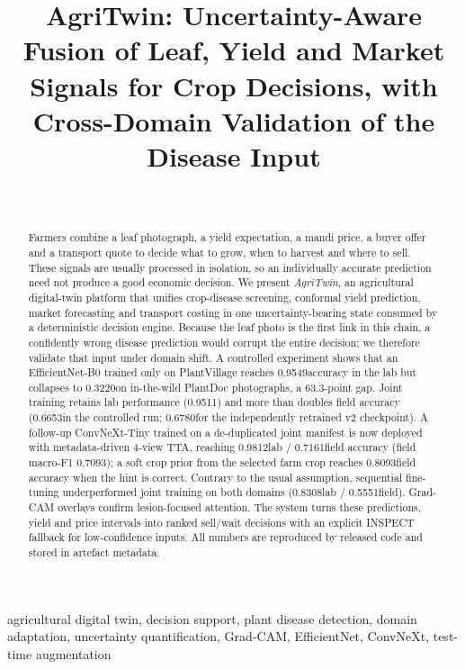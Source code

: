 \documentclass[journal,twocolumn,10pt]{IEEEtran}
\author{
  \IEEEauthorblockN{Jashwanth Aravapalli}\\
  \IEEEauthorblockA{Department of CSE (AI \& ML), Keshav Memorial Engineering College\\
  [CITY], [COUNTRY]\\
  [EMAIL]}
}
\newcommand{\PVvtwo}{0.9511}
\newcommand{\PDvtwo}{0.6780}
\newcommand{\EonePV}{0.9549}
\newcommand{\EonePD}{0.3220}
\newcommand{\EthreePDcontrolled}{0.6653}
\newcommand{\EfourPV}{0.8308}
\newcommand{\EfourPD}{0.5551}
\newcommand{\PVvthree}{0.9812}
\newcommand{\PDvthree}{0.7161}
\newcommand{\FonePDvthree}{0.7093}
\newcommand{\PDprior}{0.8093}
\begin{document}
\title{AgriTwin: Uncertainty-Aware Fusion of Leaf, Yield and Market Signals for Crop Decisions,
with Cross-Domain Validation of the Disease Input}

\maketitle

\begin{abstract}
Farmers combine a leaf photograph, a yield expectation, a mandi price, a buyer offer and a transport
quote to decide what to grow, when to harvest and where to sell. These signals are usually processed
in isolation, so an individually accurate prediction need not produce a good economic decision.
We present \emph{AgriTwin}, an agricultural digital-twin platform that unifies crop-disease
screening, conformal yield prediction, market forecasting and transport costing in one
uncertainty-bearing state consumed by a deterministic decision engine. Because the leaf photo is
the first link in this chain, a confidently wrong disease prediction would corrupt the entire
decision; we therefore validate that input under domain shift. A controlled experiment shows that
an EfficientNet-B0 trained only on PlantVillage reaches \EonePV accuracy in the lab but collapses
to \EonePD on in-the-wild PlantDoc photographs, a 63.3-point gap. Joint training retains lab
performance (\PVvtwo) and more than doubles field accuracy (\EthreePDcontrolled in the
controlled run; \PDvtwo for the independently retrained v2 checkpoint). A follow-up ConvNeXt-Tiny
trained on a de-duplicated joint manifest is now deployed with metadata-driven 4-view TTA, reaching
\PVvthree lab / \PDvthree field accuracy (field macro-F1 \FonePDvthree); a soft crop prior from
the selected farm crop reaches \PDprior field accuracy when the hint is correct. Contrary to the usual
assumption, sequential fine-tuning underperformed joint training on both domains
(\EfourPV lab / \EfourPD field). Grad-CAM overlays confirm lesion-focused attention. The system
turns these predictions, yield and price intervals into ranked sell/wait decisions with an
explicit INSPECT fallback for low-confidence inputs. All numbers are reproduced by released code
and stored in artefact metadata.
\end{abstract}

\begin{IEEEkeywords}
agricultural digital twin, decision support, plant disease detection, domain adaptation,
uncertainty quantification, Grad-CAM, EfficientNet, ConvNeXt, test-time augmentation
\end{IEEEkeywords}
\end{document}
